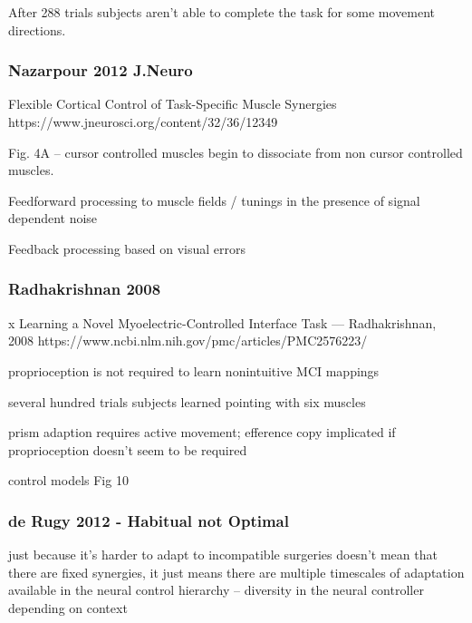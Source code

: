 \documentclass[../main.tex]{subfiles}
\begin{document}
After 288 trials subjects aren't able to complete the task for some movement directions.

\subsubsection{Nazarpour 2012 J.Neuro}\label{nazarpour-2012-j.neuro}

\cite{@nazarpourFlexibleCorticalControl2012}

Flexible Cortical Control of Task-Specific Muscle Synergies https://www.jneurosci.org/content/32/36/12349

Fig. 4A -- cursor controlled muscles begin to dissociate from non cursor controlled muscles.

Feedforward processing to muscle fields / tunings in the presence of signal dependent noise

Feedback processing based on visual errors

\subsubsection{Radhakrishnan 2008}\label{radhakrishnan-2008}

\cite{@radhakrishnanLearningNovelMyoelectricControlled2008}

x Learning a Novel Myoelectric-Controlled Interface Task --- Radhakrishnan, 2008 https://www.ncbi.nlm.nih.gov/pmc/articles/PMC2576223/

proprioception is not required to learn nonintuitive MCI mappings

several hundred trials subjects learned pointing with six muscles

prism adaption requires active movement; efference copy implicated if proprioception doesn't seem to be required

control models Fig 10

\subsubsection{de Rugy 2012 - Habitual not Optimal}\label{de-rugy-2012---habitual-not-optimal}

\cite{@derugyMuscleCoordinationHabitual2012}

just because it's harder to adapt to incompatible surgeries doesn't mean that there are fixed synergies, it just means there are multiple timescales of adaptation available in the neural control hierarchy -- diversity in the neural controller depending on context
\end{document}
